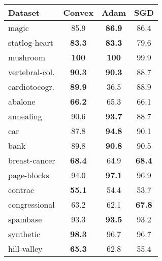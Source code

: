 \begin{table}[t]
	\centering
	\begin{small}
		\begin{tabular}{lccc} \toprule
			\textbf{Dataset} & \textbf{Convex} & \textbf{Adam} & \textbf{SGD}  \\ \midrule
			magic            & 85.9            & \textbf{86.9} & 86.4          \\
			statlog-heart    & \textbf{83.3}   & \textbf{83.3} & 79.6          \\
			mushroom         & \textbf{100}    & \textbf{100}  & 99.9          \\
            vertebral-col.   & \textbf{90.3}    & \textbf{90.3} & 88.7          \\
			cardiotocogr.    & \textbf{89.9}   & 36.5          & 88.9          \\
			abalone          & \textbf{66.2}   & 65.3          & 66.1          \\
			annealing        & 90.6            & \textbf{93.7} & 88.7          \\
			car              & 87.8            & \textbf{94.8} & 90.1          \\
			bank             & 89.8            & \textbf{90.8} & 90.5          \\
			breast-cancer    & \textbf{68.4}   & 64.9          & \textbf{68.4} \\
			page-blocks      & 94.0            & \textbf{97.1} & 96.9          \\
			contrac          & \textbf{55.1}   & 54.4          & 53.7          \\
			congressional    & 63.2            & 62.1          & \textbf{67.8} \\
			spambase         & 93.3            & \textbf{93.5} & 93.2          \\
			synthetic        & \textbf{98.3}   & 96.7          & 96.7          \\
			hill-valley      & \textbf{65.3}   & 62.8          & 55.4          \\ \bottomrule
		\end{tabular}
	\end{small}
\end{table}
